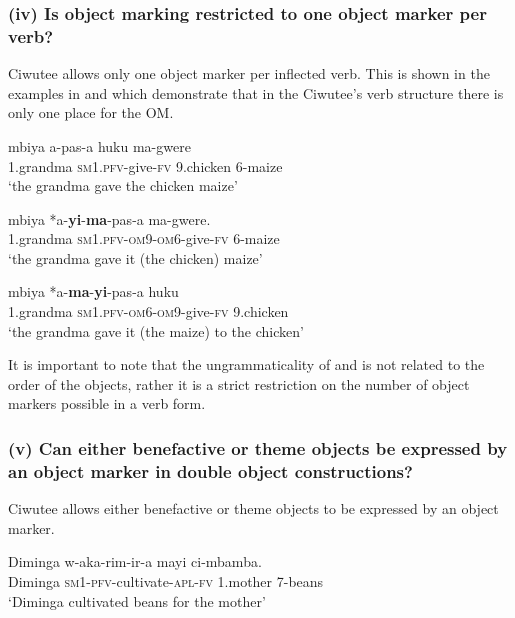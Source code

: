 \documentclass[output=paper]{langscibook}
\begin{document}
\subsubsection{(iv) Is object marking restricted to one object marker per verb?}

Ciwutee allows only one object marker per inflected verb. This is shown in the examples in  and  which demonstrate that in the Ciwutee’s verb structure there is only one place for the OM.

\ea\label{ex:ngunga:46}
\ea\label{ex:ngunga:46a} \gll mbiya    a-pas-a    huku    ma-gwere\\
1.grandma  {\textsc{sm1}.\textsc{pfv}}{}-give-{\textsc{fv}}  {9}.chicken  6-maize\\
\glt ‘the grandma gave the chicken maize’    

\ex\label{ex:ngunga:46b} \gll mbiya    *a-\textbf{yi}{}-\textbf{ma}{}-pas-a    ma-gwere.\\
1.grandma  {\textsc{sm1}.\textsc{pfv}}{}-{\textsc{om}9}-{\textsc{om}6}{}-give-{\textsc{fv}}    6-maize\\
\glt ‘the grandma gave it (the chicken) maize’

\ex\label{ex:ngunga:46c} \gll mbiya    *a-\textbf{ma}{}-\textbf{yi}{}-pas-a  huku  \\
1{.}grandma  {\textsc{sm1}.\textsc{pfv}-\textsc{om}6}-{\textsc{om}9}{}-give-\textsc{fv}  9.chicken  \\
\glt ‘the grandma gave it (the maize) to the chicken’
    \z
\z

It is important to note that the ungrammaticality of  and  is not related to the order of the objects, rather it is a strict restriction on the number of object markers possible in a verb form.

\subsubsection{(v) Can either benefactive or theme objects be expressed by an object marker in double object constructions?}

Ciwutee allows either benefactive or theme objects to be expressed by an object marker. 

\ea\label{ex:ngunga:47}
\ea\label{ex:ngunga:47a} \gll Diminga  w-aka-rim-ir-a      mayi    ci-mbamba.\\
Diminga  {\textsc{sm1-pfv}}-cultivate-\textsc{apl}-\textsc{fv}  1.mother  {7}{}-beans\\
\glt ‘Diminga cultivated beans for the mother’
\end{document}
